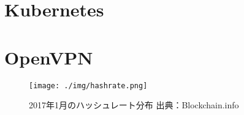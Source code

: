 \section{Kubernetes}
\label{background:kubernetes}

\section{OpenVPN}
\label{background:openvpn}

\begin{figure}[h]
    \begin{center}
        \texttt{[image: ./img/hashrate.png]}
        \caption{2017年1月のハッシュレート分布 出典：Blockchain.info\cite{bitcoinhashrate}}
        \label{img:hashrate}
    \end{center}
\end{figure}
\fi
